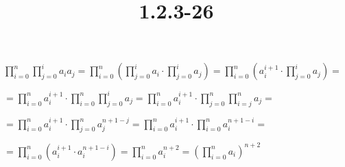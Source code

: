 \documentclass{article}
\title{1.2.3-26}
\begin{document}
\maketitle

\( \prod_{i=0}^n\prod_{j=0}^i a_ia_j = \prod_{i=0}^n(\prod_{j=0}^i a_i \cdot \prod_{j=0}^i a_j) = \prod_{i=0}^n(a_i^{i+1} \cdot \prod_{j=0}^i a_j) = \)

\( = \prod_{i=0}^n a_i^{i+1} \cdot \prod_{i=0}^n \prod_{j=0}^i a_j = \prod_{i=0}^n a_i^{i+1} \cdot \prod_{j=0}^n \prod_{i=j}^n a_j = \)

\( = \prod_{i=0}^n a_i^{i+1} \cdot \prod_{j=0}^n a_j^{n+1-j} = \prod_{i=0}^n a_i^{i+1} \cdot \prod_{i=0}^n a_i^{n+1-i} = \)

\( = \prod_{i=0}^n (a_i^{i+1} \cdot a_i^{n+1-i}) = \prod_{i=0}^n a_i^{n+2} = (\prod_{i=0}^n a_i)^{n+2} \)
\end{document}
